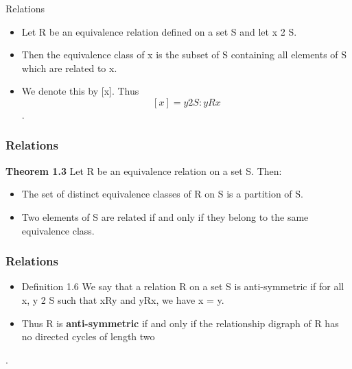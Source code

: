 \documentclass{beamer}
\begin{document}
\begin{frame}{Relations}

\Large
\begin{itemize}
\item Let R be an equivalence relation defined on a set S and let x 2 S. 
\item Then the equivalence class of x is the subset of S containing all
elements of S which are related to x. 

\item We denote this by [x]. Thus
\[[x] = {y 2 S : yRx}\].
\end{itemize}


\end{frame}
\begin{frame}
\frametitle{Relations}
\Large
\textbf{Theorem 1.3 }
Let R be an equivalence relation on a set S. Then:
\begin{itemize}
\item The set of distinct equivalence classes of R on S is a partition of S.
\item Two elements of S are related if and only if they belong to the same equivalence
class.
\end{itemize}
\end{frame}
\begin{frame}
	\frametitle{Relations}
	\Large
\Large
\begin{itemize}
\item Definition 1.6 We say that a relation R on a set S is anti-symmetric if for
all x, y 2 S such that xRy and yRx, we have x = y. 
\item Thus R is \textbf{anti-symmetric}
if and only if the relationship digraph of R has no directed cycles of length two
\end{itemize}
.
\end{frame}
\end{document}
